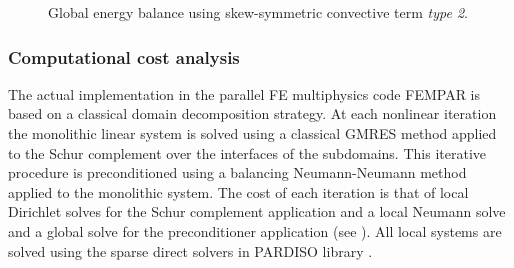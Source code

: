 \begin{figure}[h!]
	\centering	
	\caption{Global energy balance using skew-symmetric convective term \textit{type 2}.}
	\label{fig:ene_balance_sk2}
\end{figure}

\subsubsection{Computational cost analysis}

\label{subsubsec-C4_comp_cost_DHIT}
The actual implementation in the parallel FE multiphysics code FEMPAR \cite{Badia2013a} is based on a classical domain decomposition strategy. At each nonlinear iteration the monolithic linear system is solved using a classical GMRES method applied to the Schur complement over the interfaces of the subdomains. This iterative procedure is preconditioned using a balancing Neumann-Neumann method applied to the monolithic system. The cost of each iteration is that of local Dirichlet solves for the Schur complement application and a local Neumann solve and a global solve for the preconditioner application (see \cite{mandel_balancing_1993,dohrmann_preconditioner_2003,Badia2013}). All local systems are solved using the sparse direct solvers in PARDISO library \cite{Schenk2004,Schenk2006}.

